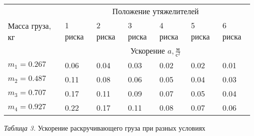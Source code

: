 \begin{center}
    \begin{tabular}{|p{2.5cm}|p{1.5cm}|p{1.5cm}|p{1.5cm}|p{1.5cm}|p{1.5cm}|p{1.5cm}|}
        \hline
        \multirow{3}{2.5cm}{Масса груза, кг} & \multicolumn{6}{c|}{Положение утяжелителей} \\
        \cline{2-7}
        & 1 риска       & 2 риска & 3 риска & 4 риска & 5 риска & 6 риска \\
        \cline{2-7}
        & \multicolumn{6}{c|}{Ускорение $a, \frac{\text{м}}{\text{с}^2}$} \\
        \hline
        $m_1 = 0.267$ &   0.06    &   0.04    &    0.03   &    0.02   &    0.02   &   0.01    \\
        \hline
        $m_2 = 0.487$ &   0.11    &   0.08    &    0.06   &    0.05   &    0.04   &   0.03    \\
        \hline
        $m_3 = 0.707$ &   0.17    &   0.11    &    0.09   &    0.07   &    0.05   &   0.04    \\
        \hline
        $m_4 = 0.927$ &   0.22    &   0.17    &    0.11   &    0.08   &    0.07   &   0.06    \\
        \hline

    \end{tabular}

    \smallvspace

    \textit{Таблица 3.} Ускорение раскручивающего груза при разных условиях
\end{center}

